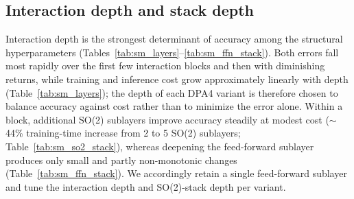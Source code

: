 \FloatBarrier

\subsection{Interaction depth and stack depth}

Interaction depth is the strongest determinant of accuracy among the structural hyperparameters (Tables~\ref{tab:sm_layers}--\ref{tab:sm_ffn_stack}).
Both errors fall most rapidly over the first few interaction blocks and then with diminishing returns, while training and inference cost grow approximately linearly with depth (Table~\ref{tab:sm_layers}); the depth of each DPA4 variant is therefore chosen to balance accuracy against cost rather than to minimize the error alone.
Within a block, additional SO(2) sublayers improve accuracy steadily at modest cost ($\sim$44\% training-time increase from 2 to 5 SO(2) sublayers; Table~\ref{tab:sm_so2_stack}), whereas deepening the feed-forward sublayer produces only small and partly non-monotonic changes (Table~\ref{tab:sm_ffn_stack}).
We accordingly retain a single feed-forward sublayer and tune the interaction depth and SO(2)-stack depth per variant.

